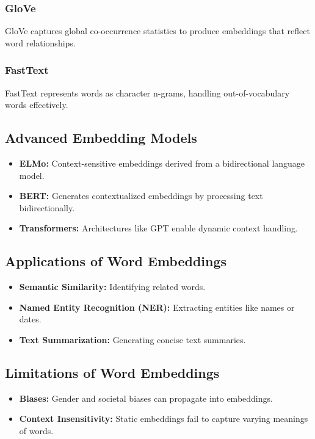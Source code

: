 \documentclass[12pt]{article}
\begin{document}
\subsubsection{GloVe}
GloVe captures global co-occurrence statistics to produce embeddings that reflect word relationships.

\subsubsection{FastText}
FastText represents words as character n-grams, handling out-of-vocabulary words effectively.

\subsection{Advanced Embedding Models}
\begin{itemize}
    \item \textbf{ELMo:} Context-sensitive embeddings derived from a bidirectional language model.
    \item \textbf{BERT:} Generates contextualized embeddings by processing text bidirectionally.
    \item \textbf{Transformers:} Architectures like GPT enable dynamic context handling.
\end{itemize}

\subsection{Applications of Word Embeddings}
\begin{itemize}
    \item \textbf{Semantic Similarity:} Identifying related words.
    \item \textbf{Named Entity Recognition (NER):} Extracting entities like names or dates.
    \item \textbf{Text Summarization:} Generating concise text summaries.
\end{itemize}

\subsection{Limitations of Word Embeddings}
\begin{itemize}
    \item \textbf{Biases:} Gender and societal biases can propagate into embeddings.
    \item \textbf{Context Insensitivity:} Static embeddings fail to capture varying meanings of words.
\end{itemize}
\end{document}
